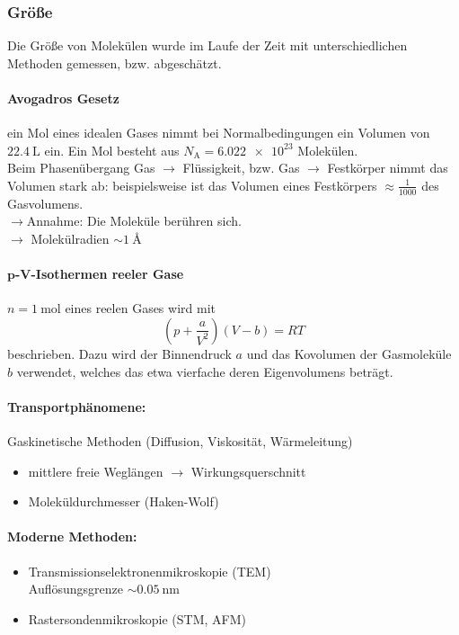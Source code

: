     \subsubsection{Größe}
    Die Größe von Molekülen wurde im Laufe der Zeit mit unterschiedlichen Methoden gemessen, bzw. abgeschätzt.
    \paragraph{Avogadros Gesetz} ein Mol eines idealen Gases nimmt bei Normalbedingungen ein Volumen  von $\SI{22,4}{\liter}$ ein. Ein Mol besteht aus $N_{\text{A}} = \num{6,022e23}$ Molekülen.\\[1ex]
    Beim Phasenübergang Gas $\to$ Flüssigkeit, bzw. Gas $\to$ Festkörper nimmt das Volumen stark ab: beispielsweise ist das Volumen eines Festkörpers $\approx\frac1{1000}${ des Gasvolumens.\\
    $\to$}Annahme: Die Moleküle berühren sich.\\
    $\to $ Molekülradien $\sim \SI{1}{\angstrom}$
    
    \paragraph{$\bm{p}$-$\bm{V}$-Isothermen reeler Gase} $n=\SI{1}{\mol}$ eines reelen Gases wird mit 
        \begin{equation}
            \label{1.1}
            \left( p + \frac{a}{V^2} \right) \left( V-b \right) = RT
        \end{equation}
        beschrieben. Dazu wird der Binnendruck $a$ und das Kovolumen der Gasmoleküle $b$ verwendet, welches das etwa vierfache deren Eigenvolumens beträgt.
    \paragraph{Transportphänomene:}
        Gaskinetische Methoden (Diffusion, Viskosität, Wärmeleitung)
        \begin{itemize}[label=$\to$]
            \item mittlere freie Weglängen $\to $ Wirkungsquerschnitt
            \item Moleküldurchmesser (Haken-Wolf)
        \end{itemize}
    \paragraph{Moderne Methoden:}
        \begin{itemize}
            \item Transmissionselektronenmikroskopie (TEM)\\ Auflösungsgrenze $\sim \SI{0,05}{\nano\meter}$
            \item Rastersondenmikroskopie (STM, AFM)
        \end{itemize}
    
